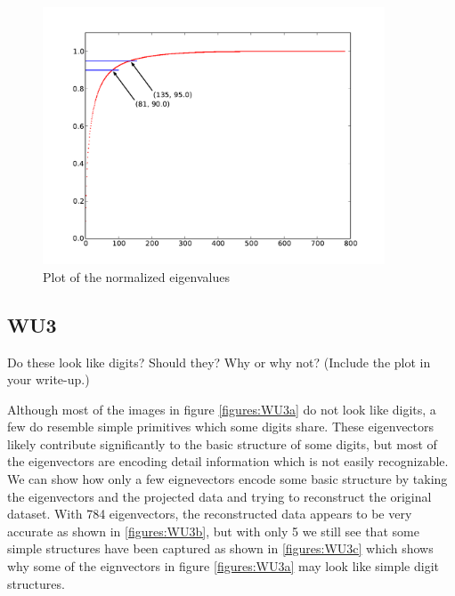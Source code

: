 \documentclass[a4paper,11pt]{article}
\begin{document}
\begin{figure}[!ht]
  \begin{center}
  \includegraphics[width=4in]{WU2_b.pdf}
  \caption{Plot of the normalized eigenvalues}
  \label{figures:WU2b}
  \end{center}
\end{figure}

\subsection{WU3}
\textsf{Do these look like digits? Should they? Why or why not?
(Include the plot in your write-up.)}\vspace{0.1in}

Although most of the images in figure \ref{figures:WU3a} do not look
like digits, a few do resemble simple primitives which some digits
share. These eigenvectors likely contribute significantly to the basic
structure of some digits, but most of the eigenvectors are encoding
detail information which is not easily recognizable. We can show how
only a few eignevectors encode some basic structure by taking the 
eigenvectors and the projected data and trying to reconstruct the original dataset.
With 784 eigenvectors, the reconstructed data appears to be very accurate 
as shown in \ref{figures:WU3b}, but with only 5 we still see that some simple
structures have been captured as shown in \ref{figures:WU3c} which shows why
some of the eignvectors in figure \ref{figures:WU3a} may look like simple digit structures.
\end{document}
